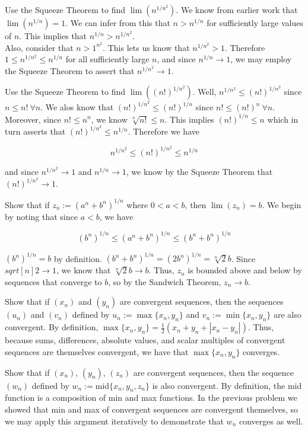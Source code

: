 \documentclass[paper=a4, fontsize=11pt]{scrartcl} %
\numberwithin{equation}{section} %
\numberwithin{figure}{section} %
\numberwithin{table}{section} %
\begin{document}
 Use the Squeeze Theorem to find $\lim(n^{1/n^2})$.
\pf We know from earlier work that $\lim(n^{1/n}) = 1$. We can infer from this that $n > n^{1/n}$ for sufficiently large values of $n$. This implies that $n^{1/n} > n^{1/n^2}$.\\

Also, consider that $n > 1^{n^2}$. This lets us know that $n^{1/n^2} > 1$. Therefore $1 \leq n^{1/n^2} \leq n^{1/n}$ for all sufficiently large $n$, and since $n^{1/n} \rightarrow 1$, we may employ the Squeeze Theorem to assert that $n^{1/n^2} \rightarrow 1$. \done

 Use the Squeeze Theorem to find $\lim((n!)^{1/n^2})$.
\pf Well, $n^{1/n^2} \leq (n!)^{1/n^2}$ since $n \leq n! ~ \forall n$. We alos know that $(n!)^{1/n^2} \leq (n!)^{1/n}$ since $n! \leq (n!)^n ~ \forall n$. Moreover, since $n! \leq n^n$, we know $\sqrt[n]{n!} \leq n$. This implies $(n!)^{1/n} \leq n$ which in turn asserts that $(n!)^{1/n^2} \leq n^{1/n}$. Therefore we have

\begin{equation*}
n^{1/n^2} \leq (n!)^{1/n^2} \leq n^{1/n}
\end{equation*}

and since $n^{1/n^2} \rightarrow 1$ and $n^{1/n} \rightarrow 1$, we know by the Squeeze Theorem that $ (n!)^{1/n^2} \rightarrow 1$. \done

 Show that if $z_n := (a^n + b^n)^{1/n}$ where $0 < a < b$, then $\lim(z_n) = b$.
\pf We begin by noting that since $a < b$, we have

\begin{equation*}
(b^n)^{1/n} \leq (a^n + b^n)^{1/n} \leq (b^n + b^n)^{1/n}
\end{equation*}

$(b^n)^{1/n} = b$ by definition. $(b^n + b^n)^{1/n} = (2b^n)^{1/n} = \sqrt[n]{2} b$. Since $sqrt[n]{2} \rightarrow 1$, we know that $\sqrt[n]{2} b \rightarrow b$. Thus, $z_n$ is bounded above and below by sequences that converge to $b$, so by the Sandwich Theorem, $z_n \rightarrow b$. \done

 Show that if $(x_n)$ and $(y_n)$ are convergent sequences, then the sequences $(u_n)$ and $(v_n)$ defined by $u_n := \max\{x_n, y_n\}$ and $v_n := \min\{x_n, y_n\}$ are also convergent.
\pf By definition, $\max\{x_n, y_n\} = \frac{1}{2}(x_n + y_n + |x_n - y_n|)$. Thus, because sums, differences, absolute values, and scalar multiples of convergent sequences are themselves convergent, we have that $\max\{x_n, y_n\}$ converges. \done

 Show that if $(x_n)$, $(y_n)$, $(z_n)$ are convergent sequences, then the sequence $(w_n)$ defined by $w_n := \text{mid}\{x_n, y_n, z_n\}$ is also convergent.
\pf By definition, the mid function is a composition of min and max functions. In the previous problem we showed that min and max of convergent sequences are convergent themselves, so we may apply this argument iteratively to demonstrate that $w_n$ converges as well. \done
\end{document}

